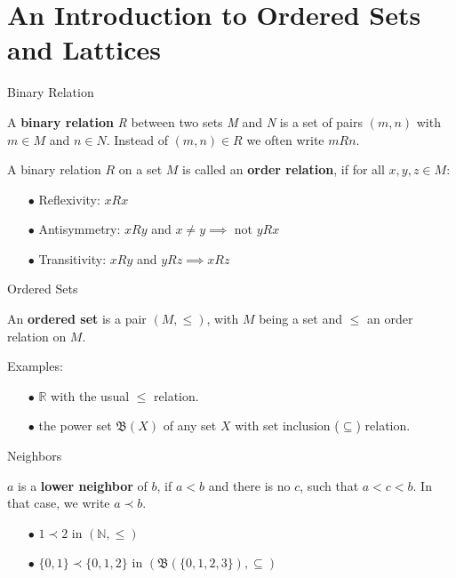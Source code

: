 \documentclass[pdf,xcolor=table]{beamer}
\begin{document}
\section[Ordered Sets and Lattices]{An Introduction to Ordered Sets and Lattices}
\begin{frame}[t]{Binary Relation}
    \begin{definition}
    A \textbf{binary relation} \textit{R} between two sets \textit{M} and \textit{N} is a set of pairs $(m, n)$ with $m \in M$ and $n \in N$. Instead of $(m, n) \in R$ we often write $mRn$.
    \end{definition}
    \begin{definition}
        A binary relation $R$ on a set $M$ is called an \textbf{order relation}, if for all $x, y, z \in M$:
        \begin{enumerate}
            \item[$\bullet$] Reflexivity: $xRx$
            \item[$\bullet$] Antisymmetry: $xRy$ and $x \ne y \implies$ not $yRx$
            \item[$\bullet$] Transitivity: $xRy$ and $yRz \implies xRz$
        \end{enumerate}
    \end{definition}
\end{frame}

\begin{frame}[t]{Ordered Sets}
    \begin{definition}
        An \textbf{ordered set} is a pair $(M, \leq)$, with $M$ being a set and $\leq$ an order relation on $M$.
    \end{definition}
    Examples:
    \begin{itemize}
        \item[$\bullet$] $\mathbb{R}$ with the usual $\leq$ relation.
        \item[$\bullet$] the power set $\mathfrak{B}(X)$ of any set $X$ with set inclusion ($\subseteq$) relation.
    \end{itemize}
\end{frame}

\begin{frame}[t]{Neighbors}
    \begin{definition}
        $a$ is a \textbf{lower neighbor} of $b$, if $a < b$ and there is no $c$, such that $a < c < b$. In that case, we write $a \prec b$.
    \end{definition}
    \begin{itemize}
        \item[$\bullet$] $1 \prec 2$ in $(\mathbb{N}, \leq)$
        \item[$\bullet$] $\{0, 1\} \prec \{0, 1, 2\}$ in $(\mathfrak{B}(\{0, 1, 2, 3\}), \subseteq)$
    \end{itemize}
\end{frame}
\end{document}
